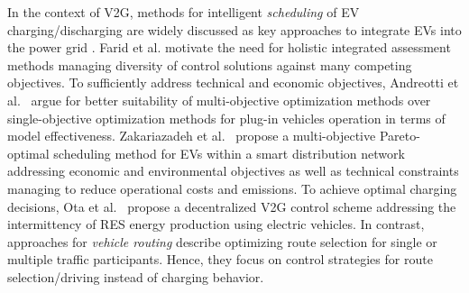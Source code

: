 In the context of V2G, methods for intelligent \textit{scheduling} of EV charging/discharging are widely discussed as key approaches to integrate EVs into the power grid 
\cite{yang2015computational}.
Farid et al. \cite{amro2016need} motivate the need for holistic integrated assessment methods managing diversity of control solutions against many competing objectives.
To sufficiently address technical and economic objectives, Andreotti et al.~\cite{andreotti2012review} argue for better suitability of multi-objective optimization methods over single-objective optimization methods for plug-in vehicles operation in terms of model effectiveness.
Zakariazadeh et al.~\cite{zakariazadeh2014multi} propose a multi-objective Pareto-optimal scheduling method for EVs within a smart distribution network addressing economic and environmental objectives as well as technical constraints managing to reduce operational costs and emissions.
To achieve optimal charging decisions, Ota et al.~\cite{ota2012autonomous} propose a decentralized V2G control scheme addressing the intermittency of RES energy production using electric vehicles. 
In contrast, approaches for \textit{vehicle routing} describe optimizing route selection for single or multiple traffic participants. Hence, they focus on control strategies for route selection/driving instead of charging behavior. 
